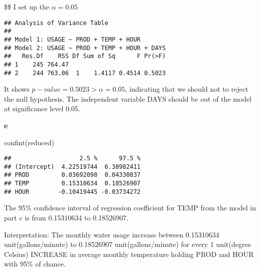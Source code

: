 \documentclass[
]{article}
\newenvironment{Shaded}{\begin{snugshade}}{\end{snugshade}}
\newcommand{\AttributeTok}[1]{\textcolor[rgb]{0.77,0.63,0.00}{#1}}
\newcommand{\CommentTok}[1]{\textcolor[rgb]{0.56,0.35,0.01}{\textit{#1}}}
\newcommand{\FunctionTok}[1]{\textcolor[rgb]{0.00,0.00,0.00}{#1}}
\newcommand{\NormalTok}[1]{#1}
\newcommand{\OtherTok}[1]{\textcolor[rgb]{0.56,0.35,0.01}{#1}}
\newcommand{\SpecialCharTok}[1]{\textcolor[rgb]{0.00,0.00,0.00}{#1}}
\begin{document}
\$\$ I set up the \(\alpha = 0.05\)

\begin{Shaded}
\end{Shaded}

\begin{verbatim}
## Analysis of Variance Table
## 
## Model 1: USAGE ~ PROD + TEMP + HOUR
## Model 2: USAGE ~ PROD + TEMP + HOUR + DAYS
##   Res.Df    RSS Df Sum of Sq      F Pr(>F)
## 1    245 764.47                           
## 2    244 763.06  1    1.4117 0.4514 0.5023
\end{verbatim}

It shows \(p-value=0.5023 > \alpha=0.05\), indicating that we should not
to reject the null hypothesis. The independent variable DAYS should be
out of the model at significance level 0.05.

\textbf{e}

\begin{Shaded}
\begin{Highlighting}[]
\FunctionTok{confint}\NormalTok{(reduced)}
\end{Highlighting}
\end{Shaded}

\begin{verbatim}
##                   2.5 %      97.5 %
## (Intercept)  4.22519744  6.38982411
## PROD         0.03692098  0.04330837
## TEMP         0.15310634  0.18526907
## HOUR        -0.10419445 -0.03734272
\end{verbatim}

The 95\% confidence interval of regression coefficient for TEMP from the
model in part c is from 0.15310634 to 0.18526907.

Interpretation: The monthly water usage increase between 0.15310634
unit(gallons/minute) to 0.18526907 unit(gallons/minute) for every 1
unit(degree Celsius) INCREASE in average monthly temperature holding
PROD and HOUR with 95\% of chance.
\end{document}
